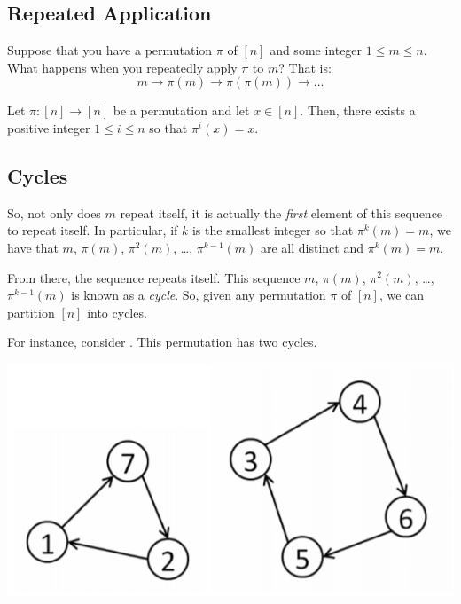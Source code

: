 \documentclass[letterpaper]{article}
\begin{document}
\subsection{Repeated Application}
Suppose that you have a permutation $\pi$ of $[n]$ and some integer $1 \leq m \leq n$. What happens when you repeatedly apply $\pi$ to $m$? That is:
\[m \to \pi(m) \to \pi(\pi(m)) \to \dots\]
\begin{lemma}{}{}
    Let $\pi: [n] \to [n]$ be a permutation and let $x \in [n]$. Then, there exists a positive integer $1 \leq i \leq n$ so that $\pi^{i}(x) = x$. 
\end{lemma}

\subsection{Cycles}
So, not only does $m$ repeat itself, it is actually the \emph{first} element of this sequence to repeat itself. In particular, if $k$ is the smallest integer so that $\pi^{k}(m) = m$, we have that $m$, $\pi(m)$, $\pi^{2}(m)$, \dots, $\pi^{k - 1}(m)$ are all distinct and $\pi^{k}(m) = m$.

\bigskip 

From there, the sequence repeats itself. This sequence $m$, $\pi(m)$, $\pi^{2}(m)$, \dots, $\pi^{k - 1}(m)$ is known as a \emph{cycle}. So, given any permutation $\pi$ of $[n]$, we can partition $[n]$ into cycles. 

\bigskip 

For instance, consider . This permutation has two cycles.
\begin{center}
    \includegraphics[scale=0.5]{ex_cycle.PNG}
\end{center}

\bigskip 
\end{document}
